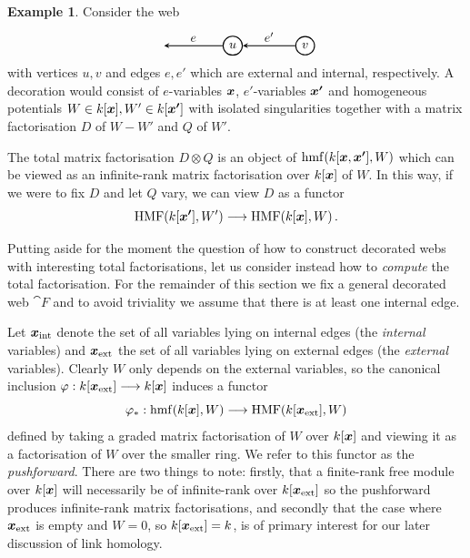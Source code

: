 \documentclass{compositio}
\theoremstyle{definition}
\newtheorem{example}[theorem]{Example}
\numberwithin{equation}{section}
\DeclareMathOperator{\hmf}{hmf}
\DeclareMathOperator{\HMF}{HMF}
\begin{document}
\begin{example}\label{example:defectonbrane} 
Consider the web
$$
\begin{tikzpicture}[scale=1.0,baseline=-0.1cm, inner sep=1mm, >=stealth]
\node (b) at (-2,0)  {};
\node (D) at (0,0) [circle,draw=black,fill= white, thick] {$u$};
\node (Q) at (2,0) [circle,draw=black,fill= white, thick] {$v$};
\draw[->,  thick] (Q) -- (D) node[midway,above] {$e'$}; 
\draw[->,  thick] (D) -- (b) node[midway,above] {$e$}; 
\end{tikzpicture} 
$$
with vertices $u,v$ and edges $e,e'$ which are external and internal, respectively. A decoration would consist of $e$-variables $\boldsymbol{x}$, $e'$-variables $\boldsymbol{x'}$ and homogeneous potentials $W \in k[\boldsymbol{x}], W' \in k[\boldsymbol{x'}]$ with isolated singularities together with a matrix factorisation $D$ of $W - W'$ and $Q$ of $W'$. 

The total matrix factorisation $D \otimes Q$ is an object of $\hmf(k[\bs{x},\bs{x'}], W)$ which can be viewed as an infinite-rank matrix factorisation over $k[\boldsymbol{x}]$ of $W$. In this way, if we were to fix $D$ and let $Q$ vary, we can view $D$ as a functor
\[
\HMF(k[\bs{x'}], W') \lto \HMF(k[\bs{x}], W)\,.
\]
\end{example}

Putting aside for the moment the question of how to construct decorated webs with interesting total factorisations, let us consider instead how to \emph{compute} the total factorisation. For the remainder of this section we fix a general decorated web $\cat{F}$ and to avoid triviality we assume that there is at least one internal edge.

Let $\boldsymbol{x}_{\textup{int}}$ denote the set of all variables lying on internal edges (the \emph{internal} variables) and $\boldsymbol{x}_{\textup{ext}}$ the set of all variables lying on external edges (the \emph{external} variables). Clearly $W$ only depends on the external variables, so the canonical inclusion $\varphi: k[\boldsymbol{x}_{\textup{ext}}] \longrightarrow k[\boldsymbol{x}]$ induces a functor
\[
\varphi_*: \hmf(k[\bs{x}], W) \lto \HMF(k[\extvar], W)
\]
defined by taking a graded matrix factorisation of $W$ over $k[\boldsymbol{x}]$ and viewing it as a factorisation of $W$ over the smaller ring. We refer to this functor as the \emph{pushforward}. There are two things to note: firstly, that a finite-rank free module over $k[\boldsymbol{x}]$ will necessarily be of infinite-rank over $k[\boldsymbol{x}_{\textup{ext}}]$ so the pushforward produces infinite-rank matrix factorisations, and secondly that the case where $\boldsymbol{x}_{\textup{ext}}$ is empty and $W = 0$, so $k[\boldsymbol{x}_{\textup{ext}}] = k$, is of primary interest for our later discussion of link homology.
\end{document}
